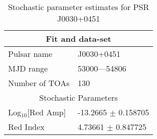 \documentclass{article}
\begin{document}
\begin{table*}
\caption{Stochastic parameter estimates for PSR J0030+0451}
\begin{tabular}{ll}
\hline\hline
\multicolumn{2}{c}{Fit and data-set} \\ 
\hline
Pulsar name\dotfill & J0030+0451 \\ 
MJD range\dotfill & 53000---54806 \\ 
Number of TOAs\dotfill & 130 \\
\hline
\multicolumn{2}{c}{Stochastic Parameters} \\ 
\hline
Log$_{10}$[Red Amp] \dotfill & -13.2665 $\pm$ 0.158705  \\ 
Red Index \dotfill & 4.73661 $\pm$ 0.847725  \\ 
\hline
\end{tabular}
\label{Table:J0030+0451}
\end{table*} 
\end{document}
